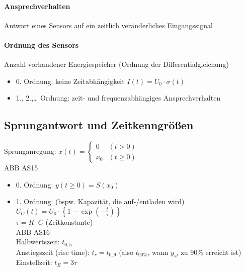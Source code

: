 \paragraph{Ansprechverhalten} Antwort eines Sensors auf ein zeitlich veränderliches Eingangssignal

\paragraph{Ordnung des Sensors} Anzahl vorhandener Energiespeicher (Ordnung der Differentialgleichung)
\begin{itemize}
\item 0. Ordnung: keine Zeitabhängigkeit $I(t) = U_0 \cdot \sigma (t)$
\item 1., 2.,… Ordnung: zeit- und frequenzabhängiges Ansprechverhalten
\end{itemize}

\subsection{Sprungantwort und Zeitkenngrößen}
Sprunganregung: $x(t) =\begin{cases}
0 &(t>0)\\
x_0 & (t \geq 0)
\end{cases}$\\
ABB AS15
\begin{itemize}
\item 0. Ordnung: $y(t\geq 0) = S(x_0)$
\item 1. Ordnung: (bspw. Kapazität, die auf-/entladen wird) $U_C(t) = U_0 \cdot \left\lbrace 1- \exp \left(-\frac{t}{\tau}\right)\right\rbrace$\\
$\tau = R \cdot C$ (Zeitkonstante)\\
ABB AS16\\
Halbwertszeit: $t_{0,5}$\\
Anstiegszeit (rise time): $t_r = t_{0,9}$ (also $t_{90\%}$, wann $y_{st}$ zu $90\%$ erreicht ist)\\
Einstellzeit: $t_E = 3 \tau$
\end{itemize}
